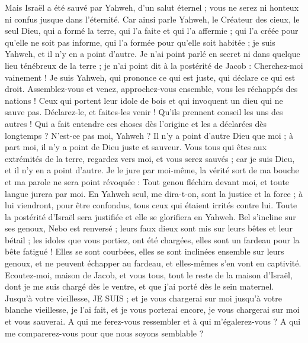 \begin{multicols}{2}
Mais Israël a été sauvé par Yahweh, d'un salut éternel ; vous ne serez ni honteux ni confus jusque dans l'éternité.
Car ainsi parle Yahweh, le Créateur des cieux, le seul Dieu, qui a formé la terre, qui l'a faite et qui l'a affermie ; qui l'a créée pour qu'elle ne soit pas informe, qui l'a formée pour qu'elle soit habitée ; je suis Yahweh, et il n'y en a point d'autre.
Je n'ai point parlé en secret ni dans quelque lieu ténébreux de la terre ; je n'ai point dit à la postérité de Jacob : Cherchez-moi vainement ! Je suis Yahweh, qui prononce ce qui est juste, qui déclare ce qui est droit.
Assemblez-vous et venez, approchez-vous ensemble, vous les réchappés des nations ! Ceux qui portent leur idole de bois et qui invoquent un dieu qui ne sauve pas.
Déclarez-le, et faites-les venir ! Qu'ils prennent conseil les uns des autres ! Qui a fait entendre ces choses dès l'origine et les a déclarées dès longtemps ? N'est-ce pas moi, Yahweh ? Il n'y a point d'autre Dieu que moi ; à part moi, il n'y a point de Dieu juste et sauveur.
Vous tous qui êtes aux extrémités de la terre, regardez vers moi, et vous serez sauvés ; car je suis Dieu, et il n'y en a point d'autre.
Je le jure par moi-même, la vérité sort de ma bouche et ma parole ne sera point révoquée : Tout genou fléchira devant moi, et toute langue jurera par moi.
En Yahweh seul, me dira-t-on, sont la justice et la force ; à lui viendront, pour être confondus, tous ceux qui étaient irrités contre lui.
Toute la postérité d'Israël sera justifiée et elle se glorifiera en Yahweh.
\VerseOne{}Bel s'incline sur ses genoux, Nebo est renversé ; leurs faux dieux sont mis sur leurs bêtes et leur bétail ; les idoles que vous portiez, ont été chargées, elles sont un fardeau pour la bête fatigué !
Elles se sont courbées, elles se sont inclinées ensemble sur leurs genoux, et ne peuvent échapper au fardeau, et elles-mêmes s'en vont en captivité.
Ecoutez-moi, maison de Jacob, et vous tous, tout le reste de la maison d'Israël, dont je me suis chargé dès le ventre, et que j'ai porté dès le sein maternel.
Jusqu'à votre vieillesse, JE SUIS ; et je vous chargerai sur moi jusqu'à votre blanche vieillesse, je l'ai fait, et je vous porterai encore, je vous chargerai sur moi et vous sauverai.
A qui me ferez-vous ressembler et à qui m'égalerez-vous ? A qui me comparerez-vous pour que nous soyons semblable ? 

\end{multicols}
